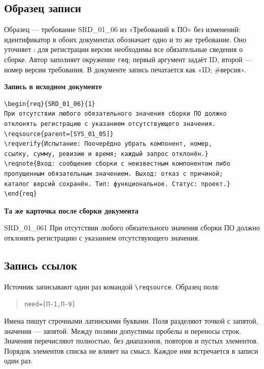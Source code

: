 \documentclass{tpks}
\begin{document}
\clearpage
\subsection{Образец записи}
Образец --- требование SRD_01_06 из «Требований к ПО» без изменений: идентификатор в обоих документах обозначает одно и то же требование. Оно уточняет : для регистрации версии необходимы все обязательные сведения о сборке. Автор заполняет окружение \texttt{req}; первый аргумент задаёт ID, второй --- номер версии требования. В документе запись печатается как «ID; \#версия».

\noindent\textbf{Запись в исходном документе}
\begin{verbatim}
\begin{req}{SRD_01_06}{1}
При отсутствии любого обязательного значения сборки ПО должно
отклонять регистрацию с указанием отсутствующего значения.
\reqsource{parent=[SYS_01_05]}
\reqverify{Испытание: Поочерёдно убрать компонент, номер,
ссылку, сумму, ревизию и время; каждый запрос отклонён.}
\reqnote{Вход: сообщение сборки с неизвестным компонентом либо
пропущенным обязательным значением. Выход: отказ с причиной;
каталог версий сохранён. Тип: функциональное. Статус: проект.}
\end{req}
\end{verbatim}

\noindent\textbf{Та же карточка после сборки документа}
\begin{req}{SRD_01_06}{1}
При отсутствии любого обязательного значения сборки ПО должно отклонять регистрацию с указанием отсутствующего значения.
\end{req}

\subsection{Запись ссылок}
Источник записывают один раз командой \verb|\reqsource|. Образец поля:
\begin{quote}
\verb|need=[П-1,П-9]|
\end{quote}
Имена пишут строчными латинскими буквами. Поля разделяют точкой с запятой, значения --- запятой. Между полями допустимы пробелы и переносы строк. Значения перечисляют полностью, без диапазонов, повторов и пустых элементов. Порядок элементов списка не влияет на смысл. Каждое имя встречается в записи один раз.
\end{document}
